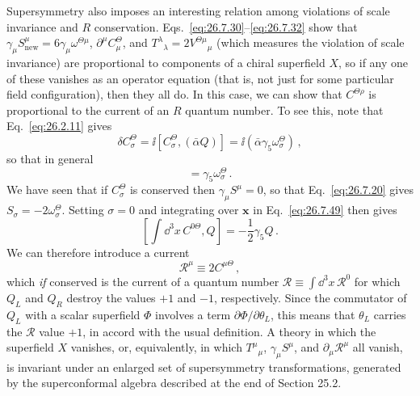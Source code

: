 Supersymmetry also imposes an interesting relation among violations of scale
invariance and \(R\) conservation. Eqs.~\eqref{eq:26.7.30}--\eqref{eq:26.7.32}
show that \(\gamma_\mu S_{\mathrm{new}}^\mu
=6\gamma_\mu\omega^{\Theta\mu}\), \(\partial^\mu C_\mu^\Theta\), and
\(T^\lambda{}_\lambda=2V^{\Theta\mu}{}_\mu\) (which measures the violation
of scale invariance) are proportional to components of a chiral superfield
\(X\), so if any one of these vanishes as an operator equation (that is, not
just for some particular field configuration), then they all do. In this
case, we can show that \(C^{\Theta\rho}\) is proportional to the current of
an \(R\) quantum number. To see this, note that Eq.~\eqref{eq:26.2.11} gives
\[
  \delta C_\sigma^\Theta
  =\ii[C_\sigma^\Theta,(\bar\alpha Q)]
  =\ii(\bar\alpha\gamma_5\omega_\sigma^\Theta)\,,
\]
so that in general
\begin{equation}
  [C_\sigma^\Theta,Q]=\gamma_5\omega_\sigma^\Theta\,.
  \tag{26.7.49}\label{eq:26.7.49}
\end{equation}
We have seen that if \(C_\sigma^\Theta\) is conserved then
\(\gamma_\mu S^\mu=0\), so that Eq.~\eqref{eq:26.7.20} gives
\(S_\sigma=-2\omega_\sigma^\Theta\). Setting \(\sigma=0\) and integrating
over \(\mathbf{x}\) in Eq.~\eqref{eq:26.7.49} then gives
\begin{equation}
  \left[
    \int \dd^3x\,C^{0\Theta},Q
  \right]
  =-\frac12\gamma_5Q\,.
  \tag{26.7.50}\label{eq:26.7.50}
\end{equation}
We can therefore introduce a current
\begin{equation}
  \mathcal{R}^\mu\equiv2C^{\mu\Theta}\,,
  \tag{26.7.51}\label{eq:26.7.51}
\end{equation}
which \emph{if} conserved is the current of a quantum number
\(\mathcal{R}\equiv\int \dd^3x\,\mathcal{R}^0\) for which \(Q_L\) and \(Q_R\)
destroy the values \(+1\) and \(-1\), respectively. Since the commutator of
\(Q_L\) with a scalar superfield \(\Phi\) involves a term
\(\partial\Phi/\partial\theta_L\), this means that \(\theta_L\) carries the
\(\mathcal{R}\) value \(+1\), in accord with the usual definition. A theory
in which the superfield \(X\) vanishes, or, equivalently, in which
\(T^\mu{}_\mu\), \(\gamma_\mu S^\mu\), and \(\partial_\mu\mathcal{R}^\mu\)
all vanish, is invariant under an enlarged set of supersymmetry
transformations, generated by the superconformal algebra described at the
end of Section 25.2.

